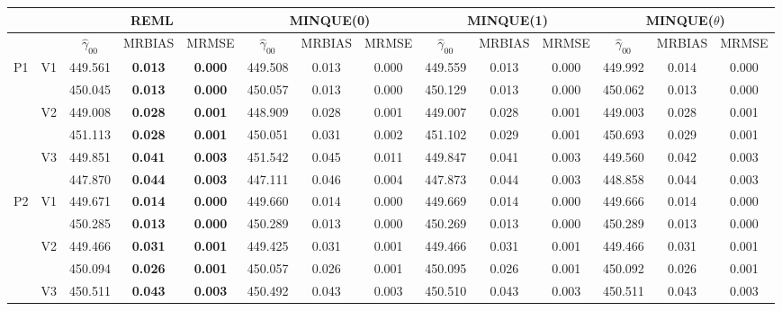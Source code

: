 \documentclass[12pt,a4paper]{article}
\begin{document}
\begin{sidewaystable}[ht]
\centering
{\footnotesize
\begin{tabular}{cc|ccc|ccc|ccc|ccc|}
   & & \multicolumn{3}{c|}{REML}&\multicolumn{3}{c|}{MINQUE(0)}&\multicolumn{3}{c|}{MINQUE(1)}&\multicolumn{3}{c|}{MINQUE($\theta$)}\\ \hline
 &  & $\hat{\gamma}_{00}$ & MRBIAS & MRMSE & $\hat{\gamma}_{00}$ & MRBIAS & MRMSE & $\hat{\gamma}_{00}$ & MRBIAS & MRMSE & $\hat{\gamma}_{00}$ & MRBIAS & MRMSE \\ 
  \hline
\multirow{6}{*}{P1} & \multirow{2}{*}{V1} & 449.561 & \textbf{0.013} & \textbf{0.000} & 449.508 & 0.013 & 0.000 & 449.559 & 0.013 & 0.000 & 449.992 & 0.014 & 0.000 \\ 
   &  & 450.045 & \textbf{0.013} & \textbf{0.000} & 450.057 & 0.013 & 0.000 & 450.129 & 0.013 & 0.000 & 450.062 & 0.013 & 0.000 \\ 
   & \multirow{2}{*}{V2} & 449.008 & \textbf{0.028} & \textbf{0.001} & 448.909 & 0.028 & 0.001 & 449.007 & 0.028 & 0.001 & 449.003 & 0.028 & 0.001 \\ 
   &  & 451.113 & \textbf{0.028} & \textbf{0.001} & 450.051 & 0.031 & 0.002 & 451.102 & 0.029 & 0.001 & 450.693 & 0.029 & 0.001 \\ 
   & \multirow{2}{*}{V3} & 449.851 & \textbf{0.041} & \textbf{0.003} & 451.542 & 0.045 & 0.011 & 449.847 & 0.041 & 0.003 & 449.560 & 0.042 & 0.003 \\ 
   &  & 447.870 & \textbf{0.044} & \textbf{0.003} & 447.111 & 0.046 & 0.004 & 447.873 & 0.044 & 0.003 & 448.858 & 0.044 & 0.003 \\ 
   \hline \hline\multirow{6}{*}{P2} & \multirow{2}{*}{V1} & 449.671 & \textbf{0.014} & \textbf{0.000} & 449.660 & 0.014 & 0.000 & 449.669 & 0.014 & 0.000 & 449.666 & 0.014 & 0.000 \\ 
   &  & 450.285 & \textbf{0.013} & \textbf{0.000} & 450.289 & 0.013 & 0.000 & 450.269 & 0.013 & 0.000 & 450.289 & 0.013 & 0.000 \\ 
   & \multirow{2}{*}{V2} & 449.466 & \textbf{0.031} & \textbf{0.001} & 449.425 & 0.031 & 0.001 & 449.466 & 0.031 & 0.001 & 449.466 & 0.031 & 0.001 \\ 
   &  & 450.094 & \textbf{0.026} & \textbf{0.001} & 450.057 & 0.026 & 0.001 & 450.095 & 0.026 & 0.001 & 450.092 & 0.026 & 0.001 \\ 
   & \multirow{2}{*}{V3} & 450.511 & \textbf{0.043} & \textbf{0.003} & 450.492 & 0.043 & 0.003 & 450.510 & 0.043 & 0.003 & 450.511 & 0.043 & 0.003 \\ 

\end{tabular}}
\end{sidewaystable}
\end{document}
